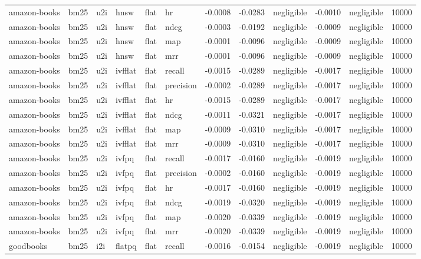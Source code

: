 \begin{tabular}{llllllrrlrlr}
amazon-books & bm25 & u2i & hnsw & flat & hr & -0.0008 & -0.0283 & negligible & -0.0010 & negligible & 10000 \\
amazon-books & bm25 & u2i & hnsw & flat & ndcg & -0.0003 & -0.0192 & negligible & -0.0009 & negligible & 10000 \\
amazon-books & bm25 & u2i & hnsw & flat & map & -0.0001 & -0.0096 & negligible & -0.0009 & negligible & 10000 \\
amazon-books & bm25 & u2i & hnsw & flat & mrr & -0.0001 & -0.0096 & negligible & -0.0009 & negligible & 10000 \\
amazon-books & bm25 & u2i & ivfflat & flat & recall & -0.0015 & -0.0289 & negligible & -0.0017 & negligible & 10000 \\
amazon-books & bm25 & u2i & ivfflat & flat & precision & -0.0002 & -0.0289 & negligible & -0.0017 & negligible & 10000 \\
amazon-books & bm25 & u2i & ivfflat & flat & hr & -0.0015 & -0.0289 & negligible & -0.0017 & negligible & 10000 \\
amazon-books & bm25 & u2i & ivfflat & flat & ndcg & -0.0011 & -0.0321 & negligible & -0.0017 & negligible & 10000 \\
amazon-books & bm25 & u2i & ivfflat & flat & map & -0.0009 & -0.0310 & negligible & -0.0017 & negligible & 10000 \\
amazon-books & bm25 & u2i & ivfflat & flat & mrr & -0.0009 & -0.0310 & negligible & -0.0017 & negligible & 10000 \\
amazon-books & bm25 & u2i & ivfpq & flat & recall & -0.0017 & -0.0160 & negligible & -0.0019 & negligible & 10000 \\
amazon-books & bm25 & u2i & ivfpq & flat & precision & -0.0002 & -0.0160 & negligible & -0.0019 & negligible & 10000 \\
amazon-books & bm25 & u2i & ivfpq & flat & hr & -0.0017 & -0.0160 & negligible & -0.0019 & negligible & 10000 \\
amazon-books & bm25 & u2i & ivfpq & flat & ndcg & -0.0019 & -0.0320 & negligible & -0.0019 & negligible & 10000 \\
amazon-books & bm25 & u2i & ivfpq & flat & map & -0.0020 & -0.0339 & negligible & -0.0019 & negligible & 10000 \\
amazon-books & bm25 & u2i & ivfpq & flat & mrr & -0.0020 & -0.0339 & negligible & -0.0019 & negligible & 10000 \\
goodbooks & bm25 & i2i & flatpq & flat & recall & -0.0016 & -0.0154 & negligible & -0.0019 & negligible & 10000 \\

\end{tabular}
